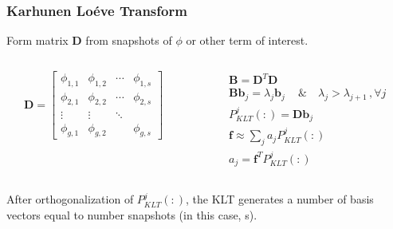 \documentclass[fleqn]{beamer}
\begin{document}
    \begin{frame}
        \frametitle{Karhunen Lo\'{e}ve Transform}
        \begin{block}{}
            Form matrix $\mathbf{D}$ from snapshots of $\phi$ or other term of
            interest.
        \end{block}
        \begin{columns}[c]
            \begin{column}{0.5\textwidth}
                \begin{equation*}
                    \mathbf{D} = \begin{bmatrix}
                        \phi_{1,1} & \phi_{1,2} & \cdots & \phi_{1,s} \\
                        \phi_{2,1} & \phi_{2,2} & \cdots & \phi_{2,s} \\
                        \vdots & \vdots & \ddots \\
                        \phi_{g,1} & \phi_{g,2} & & \phi_{g,s}
                    \end{bmatrix}
                \end{equation*}
            \end{column}
            \begin{column}{0.5\textwidth}
                \setlength{\mathindent}{0pt}
                \begin{equation*}
                    \begin{align}
                        &\mathbf{B} = \mathbf{D}^{T}\mathbf{D} \\
                        &\mathbf{Bb}_j = \lambda_j \mathbf{b}_j \,  \quad \&
                        \quad
                        \lambda_j > \lambda_{j+1} \, , \forall j \\
                        &P^j_{KLT}(:) = \mathbf{D}\mathbf{b}_j \\
                        & \mathbf{f} \approx \sum_j a_j P^j_{KLT}(:) \\
                        &a_j
                        =
                        \mathbf{f}^T P^j_{KLT}(:)
                    \end{align}
                \end{equation*}
            \end{column}
        \end{columns}
        \begin{block}{}
            After orthogonalization of $P^j_{KLT}(:)$, the KLT generates a
            number of basis vectors equal to number snapshots (in this case, s).
        \end{block}
    \end{frame}
\end{document}
